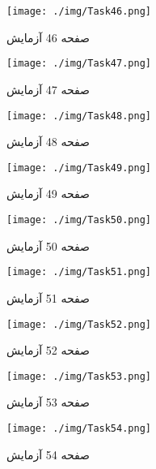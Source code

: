 {    %
    \begin{figure}[htpb]
        \centering
        \texttt{[image: ./img/Task46.png]}
        \caption{ صفحه 46 آزمایش }
        \label{fig:Task46}
    \end{figure}


    \begin{figure}[htpb]
        \centering
        \texttt{[image: ./img/Task47.png]}
        \caption{ صفحه 47 آزمایش }
        \label{fig:Task47}
    \end{figure}


    \begin{figure}[htpb]
        \centering
        \texttt{[image: ./img/Task48.png]}
        \caption{ صفحه 48 آزمایش }
        \label{fig:Task48}
    \end{figure}


    \begin{figure}[htpb]
        \centering
        \texttt{[image: ./img/Task49.png]}
        \caption{ صفحه 49 آزمایش }
        \label{fig:Task49}
    \end{figure}


    \begin{figure}[htpb]
        \centering
        \texttt{[image: ./img/Task50.png]}
        \caption{ صفحه 50 آزمایش }
        \label{fig:Task50}
    \end{figure}


    \begin{figure}[htpb]
        \centering
        \texttt{[image: ./img/Task51.png]}
        \caption{ صفحه 51 آزمایش }
        \label{fig:Task51}
    \end{figure}


    \begin{figure}[htpb]
        \centering
        \texttt{[image: ./img/Task52.png]}
        \caption{ صفحه 52 آزمایش }
        \label{fig:Task52}
    \end{figure}


    \begin{figure}[htpb]
        \centering
        \texttt{[image: ./img/Task53.png]}
        \caption{ صفحه 53 آزمایش }
        \label{fig:Task53}
    \end{figure}


    \begin{figure}[htpb]
        \centering
        \texttt{[image: ./img/Task54.png]}
        \caption{ صفحه 54 آزمایش }
        \label{fig:Task54}
    \end{figure}


}
